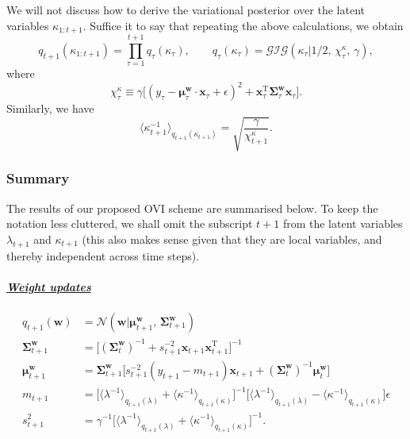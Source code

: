 We will not discuss how to derive the variational posterior over the latent variables $\kappa_{1:t+1}$. Suffice it to say that repeating the above calculations, we obtain
\begin{equation}
	q_{t+1}(\kappa_{1:t+1})
	= \prod_{\tau=1}^{t+1} q_{\tau}(\kappa_\tau),
	\qquad
	q_{\tau}(\kappa_\tau)
	= \mathcal{GIG}(\kappa_\tau|1/2,\, \chi_{\tau}^{\kappa},\, \gamma),
\end{equation}
where
\begin{equation}
	\chi_{\tau}^{\kappa}
	\equiv \gamma\big[(y_\tau - \boldsymbol{\mu}_{\tau}^\mathbf{w}\cdot\mathbf{x}_\tau + \epsilon)^2 + \mathbf{x}_\tau^\text{T}\boldsymbol{\Sigma}_{\tau}^\mathbf{w}\mathbf{x}_\tau\big].
\end{equation}
Similarly, we have
\begin{equation}
	\langle\kappa_{t+1}^{-1}\rangle_{q_{t+1}(\kappa_{t+1})}
	= \sqrt{\frac{\gamma}{\chi_{t+1}^{\kappa}}}.
\end{equation}

\subsubsection{Summary}

The results of our proposed OVI scheme are summarised below. To keep the notation less cluttered, we shall omit the subscript $t+1$ from the latent variables $\lambda_{t+1}$ and $\kappa_{t+1}$ (this also makes sense given that they are local variables, and thereby independent across time steps).
\paragraph{\underline{\it{Weight updates}}}
\begin{align}
	q_{t+1}(\mathbf{w})
	&= \mathcal{N}(\mathbf{w}|\boldsymbol{\mu}_{t+1}^\mathbf{w},\, \boldsymbol{\Sigma}_{t+1}^\mathbf{w})
	\label{eq:variational-weight-posterior-final} \\
	\boldsymbol{\Sigma}_{t+1}^\mathbf{w}
	&= \big[(\boldsymbol{\Sigma}_{t}^\mathbf{w})^{-1} + s_{t+1}^{-2}\mathbf{x}_{t+1}\mathbf{x}_{t+1}^\text{T}\big]^{-1}
	\label{eq:pa-var-weight-cov} \\
	\boldsymbol{\mu}_{t+1}^\mathbf{w}
	&= \boldsymbol{\Sigma}_{t+1}^\mathbf{w}\big[s_{t+1}^{-2}(y_{t+1} - m_{t+1})\mathbf{x}_{t+1} + (\boldsymbol{\Sigma}_{t}^\mathbf{w})^{-1}\boldsymbol{\mu}_{t}^\mathbf{w}\big]
	\label{eq:pa-var-weight-mean} \\	
	m_{t+1}
	&= \big[\langle\lambda^{-1}\rangle_{q_{t+1}(\lambda)} + \langle\kappa^{-1}\rangle_{q_{t+1}(\kappa)}\big]^{-1}\big[\langle\lambda^{-1}\rangle_{q_{t+1}(\lambda)} - \langle\kappa^{-1}\rangle_{q_{t+1}(\kappa)}\big]\epsilon
	\\
	s_{t+1}^2
	&= \gamma^{-1}\big[\langle\lambda^{-1}\rangle_{q_{t+1}(\lambda)} + \langle\kappa^{-1}\rangle_{q_{t+1}(\kappa)}\big]^{-1}.
\end{align}
